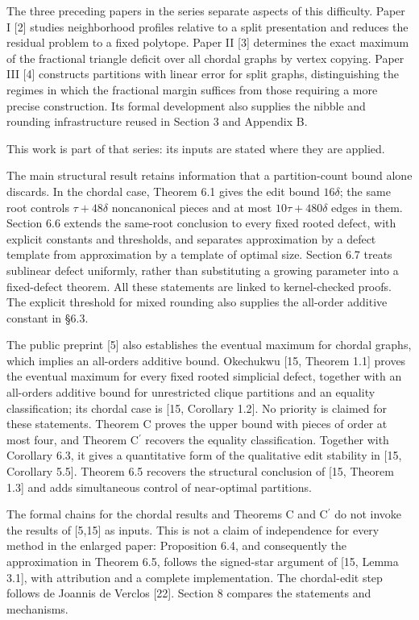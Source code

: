\documentclass[english,11pt,a4paper]{article}
\begin{document}
The three preceding papers in the series separate aspects of this difficulty. Paper I {[}2{]} studies neighborhood profiles relative to a split presentation and reduces the residual problem to a fixed polytope. Paper II {[}3{]} determines the exact maximum of the fractional triangle deficit over all chordal graphs by vertex copying. Paper III {[}4{]} constructs partitions with linear error for split graphs, distinguishing the regimes in which the fractional margin suffices from those requiring a more precise construction. Its formal development also supplies the nibble and rounding infrastructure reused in Section 3 and Appendix B.

This work is part of that series: its inputs are stated where they are applied.

The main structural result retains information that a partition-count bound alone discards. In the chordal case, Theorem 6.1 gives the edit bound \(16\delta\); the same root controls \(\tau+48\delta\) noncanonical pieces and at most \(10\tau+480\delta\) edges in them. Section 6.6 extends the same-root conclusion to every fixed rooted defect, with explicit constants and thresholds, and separates approximation by a defect template from approximation by a template of optimal size. Section 6.7 treats sublinear defect uniformly, rather than substituting a growing parameter into a fixed-defect theorem. All these statements are linked to kernel-checked proofs. The explicit threshold for mixed rounding also supplies the all-order additive constant in §6.3.

The public preprint {[}5{]} also establishes the eventual maximum for chordal graphs, which implies an all-orders additive bound. Okechukwu {[}15, Theorem 1.1{]} proves the eventual maximum for every fixed rooted simplicial defect, together with an all-orders additive bound for unrestricted clique partitions and an equality classification; its chordal case is {[}15, Corollary 1.2{]}. No priority is claimed for these statements. Theorem C proves the upper bound with pieces of order at most four, and Theorem \texorpdfstring{C\ensuremath{^{\prime}}}{C'} recovers the equality classification. Together with Corollary 6.3, it gives a quantitative form of the qualitative edit stability in {[}15, Corollary 5.5{]}. Theorem 6.5 recovers the structural conclusion of {[}15, Theorem 1.3{]} and adds simultaneous control of near-optimal partitions.

The formal chains for the chordal results and Theorems C and \texorpdfstring{C\ensuremath{^{\prime}}}{C'} do not invoke the results of {[}5,15{]} as inputs. This is not a claim of independence for every method in the enlarged paper: Proposition 6.4, and consequently the approximation in Theorem 6.5, follows the signed-star argument of {[}15, Lemma 3.1{]}, with attribution and a complete implementation. The chordal-edit step follows de Joannis de Verclos {[}22{]}. Section 8 compares the statements and mechanisms.
\end{document}

